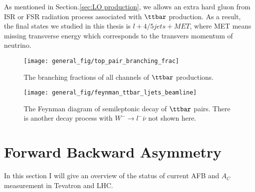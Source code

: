 As mentioned in Section.\ref{sec:LO production}, we allows an extra hard gluon from ISR or FSR radiation process associated with $\ttbar$ production. As a result, the final states we studied in this thesis is $l+4/5jets+MET$, where MET means missing transverse energy which corresponds to the transvers momentum of neutrino. 

\begin{figure}[hbt]
	\begin{center}
		\texttt{[image: general\_fig/top\_pair\_branching\_frac]}
		\caption{\small The branching fractions of all channels of $\ttbar$ productions.}
		\label{fig:TT_composition}
	\end{center}
\end{figure}

\begin{figure}[hbt]
	\begin{center}
		\texttt{[image: general\_fig/feynman\_ttbar\_ljets\_beamline]}
		\caption{\small The Feynman diagram of semileptonic decay of $\ttbar$ pairs. There is another decay process with $W^-\rightarrow l^-\bar \nu$ not shown here.}
		\label{fig:TT_semileptonic}
	\end{center}
\end{figure}

 
\section{Forward Backward Asymmetry}
\label{sec:AFB}

In this section I will give an overview of the status of current AFB and $A_C$ measurement in Tevatron and LHC.